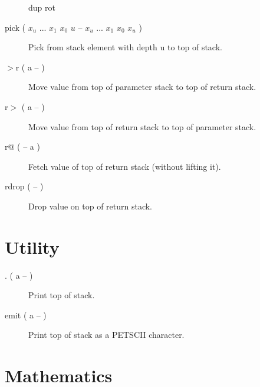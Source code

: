 \begin{description}
dup rot

\item[pick ( $x_u$ ... $x_1$ $x_0$ $u$ -- $x_u$ ... $x_1$ $x_0$ $x_u$ )]

Pick from stack element with depth u to top of stack.

\item[$>$r ( a -- )]

Move value from top of parameter stack to top of return stack. 

\item[r$>$ ( a -- )]

Move value from top of return stack to top of parameter stack. 

\item[r@ ( -- a )]

Fetch value of top of return stack (without lifting it).

\item[rdrop ( -- )]

Drop value on top of return stack.

\end{description}

\section{Utility}

\begin{description}
\item[. ( a -- )]

Print top of stack.

\item[emit ( a -- )]

Print top of stack as a PETSCII character.

\end{description}

\section{Mathematics}

